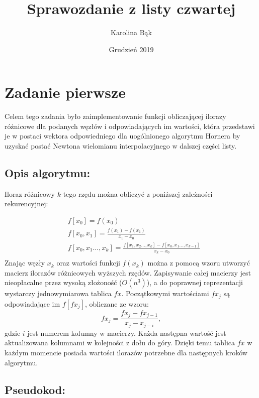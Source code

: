 \documentclass{article}
\title{Sprawozdanie z listy czwartej}
\author{Karolina Bąk}
\date{Grudzień 2019}
\begin{document}
\maketitle

\section{Zadanie pierwsze}
 Celem tego zadania było zaimplementowanie funkcji obliczającej ilorazy
 różnicowe dla podanych węzłów i odpowiadających im wartości, 
 która przedstawi je w postaci wektora odpowiedniego dla 
 uogólnionego algorytmu Hornera by uzyskać postać Newtona 
 wielomianu interpolacyjnego w dalszej części listy.
\newline
 \subsection{Opis algorytmu:}

 Iloraz różnicowy \(k\)-tego rzędu można obliczyć z poniższej 
 zależności rekurencyjnej:

 $$
 \begin{aligned}
    &f[x_0] = f(x_0)\\
    &f[x_0,x_1] = \frac{f(x_1) - f(x_1)}{x_1 - x_0}\\
    &f[x_0,x_1\dots,x_k] = \frac{f[x_1,x_2\dots,x_k] - f[x_0,x_1\dots,x_{k-1}]}{x_k - x_0}\\
 \end{aligned}
 $$
\newline
 Znając węzły \(x_k\) oraz wartości funkcji \(f(x_k)\) można z pomocą wzoru 
 utworzyć macierz ilorazów różnicowych wyższych rzędów. 
 Zapisywanie całej macierzy jest nieopłacalne przez wysoką złożoność ($O(n^3)$), a do 
 poprawnej reprezentacji wystarczy jednowymiarowa tablica \(fx\). 
 Początkowymi wartościami \(fx_j\) są odpowiadające im 
 \(f[fx_j]\), obliczane ze wzoru:
 \[fx_j = \frac{fx_j - fx_{j-1}}{x_j - x_{j-i}},\] gdzie 
 \(i\) jest numerem kolumny w macierzy. Każda 
 następna wartość jest aktualizowana kolumnami w kolejności z 
 dołu do góry. Dzięki temu tablica 
 \(fx\) w każdym momencie posiada wartości ilorazów potrzebne dla następnych 
 kroków algorytmu.
 \newline
 \newline
 
\subsection{Pseudokod:}
\end{document}
